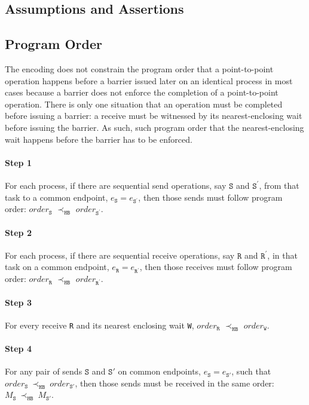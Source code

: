\subsection{Assumptions and Assertions}

\subsection{Program Order}
The encoding does not constrain the program order that a point-to-point operation happens before a barrier issued later on an identical process in most cases because a barrier does not enforce the completion of a point-to-point operation. There is only one situation that an operation must be completed before issuing a barrier: a receive must be witnessed by its nearest-enclosing wait before issuing the barrier. As such, such program order that the nearest-enclosing wait happens before the barrier has to be enforced.

\paragraph*{Step 1} For each process, if there are sequential send
operations, say $\mathtt{S}$ and $\mathtt{S^\prime}$, from that task
to a common endpoint, $e_\mathtt{S} = e_\mathtt{S^\prime}$, then those
sends must follow program order: $\mathit{order}_\mathtt{S}$
$\prec_\mathtt{HB}$ $\mathit{order}_\mathtt{S^\prime}$.

\paragraph*{Step 2} For each process, if there are sequential receive
operations, say $\mathtt{R}$ and $\mathtt{R^\prime}$, in that task
on a common endpoint, $e_\mathtt{R} = e_\mathtt{R^\prime}$, then those
receives must follow program order: $\mathit{order}_\mathtt{R}$
$\prec_\mathtt{HB}$ $\mathit{order}_\mathtt{R^\prime}$.

\paragraph*{Step 3} For every receive \texttt{R} and its nearest
enclosing wait \texttt{W}, $\mathit{order}_\mathtt{R}$
$\prec_\mathtt{HB}$ $\mathit{order}_\mathtt{W}$.

\paragraph*{Step 4} For any pair of sends $\mathtt{S}$ and
$\mathtt{S'}$ on common endpoints, $e_{\mathtt{S}}=e_{\mathtt{S'}}$,
such that
$\mathit{order}_\mathtt{S}\ \mathrm{\prec_\mathtt{HB}}\ \mathit{order}_\mathtt{S'}$,
then those sends must be received in the same order:
$M_{\mathtt{S}}\ \mathrm{\prec_{\mathtt{HB}}}\ M_{\mathtt{S'}}$.

